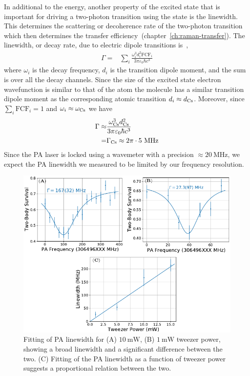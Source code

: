 In additional to the energy, another property of the excited state
that is important for driving a two-photon transition using the state is the linewidth.
This determines the scattering or decoherence rate of
the two-photon transition which then determines
the transfer efficiency~(chapter~\ref{ch:raman-transfer}).
The linewidth, or decay rate, due to electric dipole transitions
is~\cite[p.~197]{bransden_physics_2003},
\begin{align*}
  \Gamma=&\sum_{i}\frac{\omega_i^3d_i^2\mathrm{FCF}_i}{3\pi\varepsilon_0\hbar c^3}
\end{align*}
where $\omega_i$ is the decay frequency, $d_i$ is the transition dipole moment,
and the sum is over all the decay channels.
Since the size of the excited state electron wavefunction is similar to that of the atom
the molecule has a similar transition dipole moment as the corresponding atomic transition
$d_i\approx d_{\mathrm{Cs}}$. Moreover, since $\sum_i\mathrm{FCF}_i=1$ and $\omega_i\approx\omega_{\mathrm{Cs}}$
we have
\begin{align*}
  \Gamma\approx&\frac{\omega_{\mathrm{Cs}}^3d_{\mathrm{Cs}}^2}{3\pi\varepsilon_0\hbar c^3}\\
  =&\Gamma_{\mathrm{Cs}}\approx2\pi\cdot5~\mathrm{MHz}
\end{align*}
Since the PA laser is locked using a wavemeter with a precision
$\approx\!20~\mathrm{MHz}$, we expect the PA linewidth we measured to be limited
by our frequency resolution.

\begin{figure}
  \centering
  \includegraphics[width=\textwidth]{figures/pa_linewidth_red_twr.pdf}
  \caption[PA linewidth for red detuned tweezer]{
    Fitting of PA linewidth for (A) $10~\mathrm{mW}$, (B) $1~\mathrm{mW}$ tweezer power,
    showing a broad linewidth and a significant difference between the two.
    (C) Fitting of the PA linewidth as a function of tweezer power suggests
    a proportional relation between the two.
    \label{fig:pa:linewidth:red-twr}}
\end{figure}

